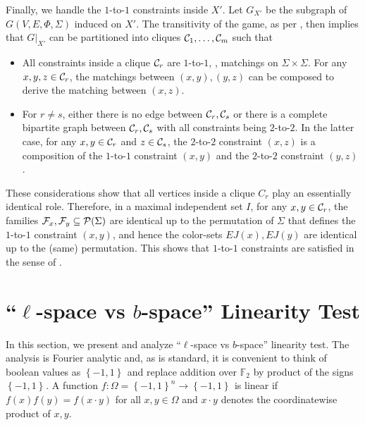 \documentclass{toc}
\newcommand\set[1]{{\left\{ #1 \right\}}}
\newcommand\cube[1]{ { \set{-1,1}^{#1} } }
\begin{document}
Finally, we handle the $1$-to-$1$ constraints inside $X'$. Let $G_{X'}$ be the subgraph of
$G(V,E,\Phi, \Sigma)$ induced on $X'$.  The
transitivity of the game, as per ,
then implies that $G|_{X'}$ can be partitioned into
cliques ${\cal C}_1,\ldots,{\cal C}_m$ such that
\begin{itemize}
\item All constraints inside a clique ${\cal C}_r$ are $1$-to-$1$, \ie, matchings on $\Sigma \times \Sigma$.
      For any $x,y,z \in {\cal C}_r$,
      the matchings between $(x,y), (y,z)$ can be composed to derive the matching between $(x,z)$.
\item For $r\neq s$, either there is no edge between ${\cal C}_r, {\cal C}_s$ or there is
a complete bipartite graph between ${\cal C}_r, {\cal C}_s$ with all constraints being $2$-to-$2$.
In the latter case, for any $x, y \in {\cal C}_r$ and $z \in {\cal C}_s$, the $2$-to-$2$ constraint $(x,z)$ is
a composition of the $1$-to-$1$ constraint $(x,y)$ and the $2$-to-$2$ constraint $(y,z)$.
\end{itemize}
These considerations show that all vertices inside a clique $C_r$ play an essentially identical role. Therefore,
in a maximal independent set $I$, for any $x, y \in {\cal C}_r$,
the families ${\cal F}_x, {\cal F}_y \subseteq {\cal P}(\Sigma)$ are identical up to the permutation of
$\Sigma$ that defines the $1$-to-$1$ constraint $(x,y)$, and hence the color-sets $EJ(x), EJ(y)$ are
identical up to the (same) permutation. This shows that $1$-to-$1$ constraints are satisfied in the
sense of .







\section{\texorpdfstring{``$\ell$-space vs $b$-space''}{``l-space vs b-space''}
  Linearity Test}\label{appendix:linearity_testing}
In this section, we present and analyze ``$\ell$-space vs $b$-space'' linearity test. The analysis is Fourier
analytic and, as is standard, it is convenient to think of boolean values as $\cube{}$ and replace addition
over ${\mathbb F}_2$ by product of the signs $\cube{}$.
A function $f: \Omega = \cube{n}
\to \cube{}$ is linear if $f(x) f(y) = f(x\cdot y)$ for all $x, y \in \Omega$ and $x\cdot y$ denotes the coordinatewise
product of $x, y$.
\end{document}
